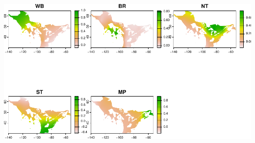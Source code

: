 \documentclass[
]{book}
\begin{document}
\includegraphics{Mignette_files/figure-latex/unnamed-chunk-26-1.pdf}

  
\end{document}
